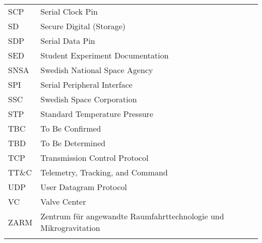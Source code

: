 \begin{longtable}{p{3cm} p{9cm}}
            SCP         & Serial Clock Pin\\
            SD          & Secure Digital (Storage) \\
            SDP         & Serial Data Pin\\
            SED         & Student Experiment Documentation \\
            SNSA        & Swedish National Space Agency \\
            SPI         & Serial Peripheral Interface\\
            SSC         & Swedish Space Corporation \\
            STP         & Standard Temperature Pressure\\
            TBC         & To Be Confirmed\\
            TBD         & To Be Determined \\
            TCP         & Transmission Control Protocol\\
            TT$\&$C     & Telemetry, Tracking, and Command\\
            UDP         & User Datagram Protocol\\
            VC          & Valve Center\\ 
            ZARM        & Zentrum f{\"u}r angewandte Raumfahrttechnologie und Mikrogravitation \\            
        \label{tab:abbrevi}
    \end{longtable}
    \raggedbottom